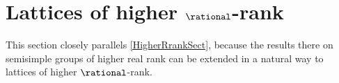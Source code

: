 %
%
%
% 
% 
%



\section{Lattices of higher \texorpdfstring{$\rational$}{Q}-rank}

This section closely parallels \cref{HigherRrankSect}, because the results there on semisimple groups of higher real rank can be extended in a natural way to lattices of higher $\rational$-rank.

